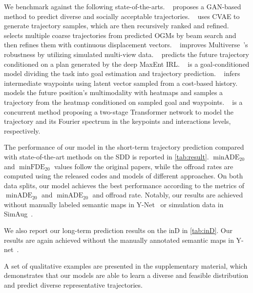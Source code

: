 \documentclass[10pt,twocolumn,letterpaper]{article}
\begin{document}
We benchmark against the following state-of-the-arts.
    ~\cite{gupta2018social} proposes a GAN-based method to predict diverse and socially acceptable trajectories.
       ~\cite{lee2017desire} uses CVAE to generate trajectory samples, which are then recursively ranked and refined.
    ~\cite{liang2020garden} selects multiple coarse trajectories from predicted OGMs by beam search and then refines them with continuous displacement vectors.
        ~\cite{liang2020simaug} improves Multiverse~\cite{liang2020garden}'s robustness by utilizing simulated multi-view data. 
        ~\cite{deo2020trajectory} predicts the future trajectory conditioned on a plan generated by the deep MaxEnt IRL. 
        ~\cite{mangalam2020not} is a goal-conditioned model dividing the task into goal estimation and trajectory prediction. 
        ~\cite{pang2021trajectory} infers intermediate waypoints using latent vector sampled from a cost-based history.
        ~\cite{mangalam2021goals} models the future position's multimodality with heatmaps and samples a trajectory from the heatmap conditioned on sampled goal and waypoints. 
        ~\cite{wong2021view} is a concurrent method proposing a two-stage Transformer network to model the trajectory and its Fourier spectrum in the keypoints and interactions levels, respectively.

The performance of our model in the short-term trajectory prediction compared with state-of-the-art methods on the SDD is reported in \cref{tab:result}. $\operatorname{minADE}_{20}$ and $\operatorname{minFDE}_{20}$ values follow the original papers, while the offroad rates are computed using the released codes and models of different approaches.
On both data splits, our model achieves the best performance according to the metrics of $\operatorname{minADE}_{20}$ and $\operatorname{minADE}_{20}$ and offroad rate. Notably, our results are achieved without manually labeled semantic maps in Y-Net~\cite{mangalam2021goals} or simulation data in SimAug~\cite{liang2020simaug}. 

We also report our long-term prediction results on the inD in \cref{tab:inD}. Our results are again achieved without the manually annotated semantic maps in Y-net~\cite{mangalam2021goals}.

A set of qualitative examples are presented in the supplementary material, which demonstrates that our models are able to learn a diverse and feasible distribution and predict diverse representative trajectories. 
\end{document}
